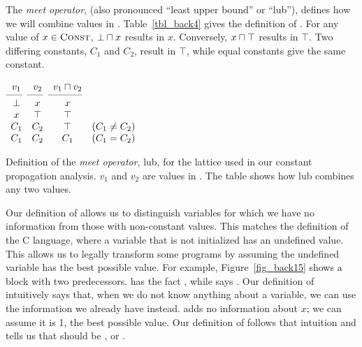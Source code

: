 \documentclass[12pt]{report}
\begin{document}
The \emph{meet operator}, \lub (also pronounced ``least upper bound'' or
``lub''), defines how we will combine values in
\setLC. Table~\ref{tbl_back4} gives the definition of \lub. For any
value of $x \in \textsc{Const}$, $\bot \lub x$ results in $x$. Conversely, $x
\lub \top$ results in $\top$. Two differing constants, $C_1$ and
$C_2$, result in $\top$, while equal constants give the same constant. 

\begin{myfig}
  \begin{math}
    \begin{array}{cccc}
      v_1 & v_2 & v_1 \lub v_2 \\
      \cmidrule(r){1-1}\cmidrule(r){2-2}\cmidrule(r){3-3}
      \bot & x & x \\
      x & \top & \top & \\ 
      C_1 & C_2 & \top & \text{($C_1 \neq C_2$)} \\
      C_1 & C_2 & C_1 & \text{($C_1 = C_2$)}
    \end{array}
  \end{math}
  \caption{Definition of the \emph{meet operator}, lub, for the
    lattice used in our constant propagation analysis. $v_1$ and $v_2$
    are values in \setLC. The table shows how lub combines any two
    values.}
  \label{tbl_back4}
\end{myfig}

Our definition of \lub allows us to distinguish variables for which we
have no information from those with non-constant values. This matches
the definition of the C language, where a variable that is not
initialized has an undefined value. This allows us to legally
transform some programs by assuming the undefined variable has the
best possible value. For example, Figure~\ref{fig_back15} shows a
block with two predecessors.  has the fact
, while  says . Our
definition of \lub intuitively says that, when we do not know anything
about a variable, we can use the information we already have
instead.  adds no information about $x$; we can
assume it is 1, the best possible value. Our definition of \lub
follows that intuition and tells us that  should be
, or .
\end{document}
